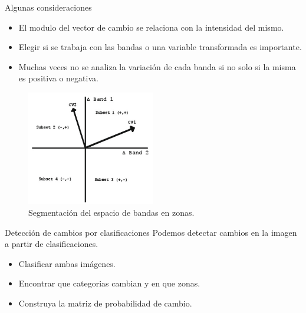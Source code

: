 \documentclass[handout,draft]{beamer}
\begin{document}
\begin{frame}{\subsecname}
  \begin{block}{Algunas consideraciones}
    \begin{itemize}[<+>]
      \item El modulo del vector de cambio se relaciona con la intensidad del mismo.
      \item Elegir si se trabaja con las bandas o una variable transformada es importante.
      \item Muchas veces no se analiza la variaci\'on de cada banda si no solo si la misma es positiva o negativa.
    \end{itemize}
  \end{block}
\end{frame}

\begin{frame}{\subsecname}
  \begin{figure}
  \includegraphics[width=0.5\textwidth]{imagenes/dangulos.png}
  \caption{Segmentaci\'on del espacio de bandas en zonas.}
  \end{figure}
\end{frame}

\begin{frame}{\subsecname}
  \begin{block}{Detecci\'on de cambios por clasificaciones}
    Podemos detectar cambios en la imagen a partir de clasificaciones.\pause
    \begin{itemize}[<+>]
      \item Clasificar ambas im\'agenes.
      \item Encontrar que categorias cambian y en que zonas.
      \item Construya la matriz de probabilidad de cambio.
    \end{itemize}
  \end{block}
\end{frame}
\end{document}
